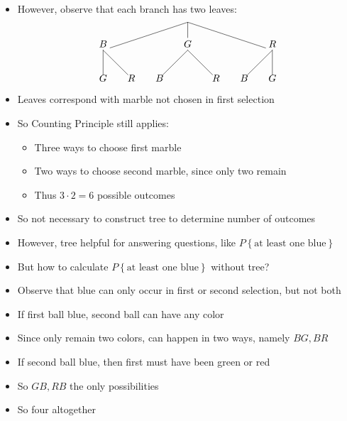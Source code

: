 \documentclass{beamer}
\theoremstyle{definition}
\begin{document}
\begin{frame}
\begin{itemize}
\item However, observe that each branch has two leaves:
\[\begin{xy}<1cm,0cm>:
(0,0)="0";
(-3,-1)="-31";
(0,-1)="01";
(3,-1)="31";
"0";"-31"*+!D{B}**\dir{-};
"0";"01"*+!D{G}**\dir{-};
"0";"31"*+!D{R}**\dir{-};
"-31";(-3,-2)*{G}**\dir{-};
"-31";(-2,-2)*{R}**\dir{-};
"01";(-1,-2)*{B}**\dir{-};
"01";(1,-2)*{R}**\dir{-};
"31";(2,-2)*{B}**\dir{-};
"31";(3,-2)*{G}**\dir{-};
\end{xy}\]
\item Leaves correspond with marble \alert{not chosen}
in first selection
\item So Counting Principle still applies:
\begin{itemize}
\item Three ways to choose first marble
\item \alert{Two} ways to choose second marble, since only two remain
\item Thus $3\cdot 2=6$ possible outcomes
\end{itemize}
\item So not necessary to construct tree to determine
number of outcomes
\item However, tree helpful for answering questions, like
$P\left\{\text{at least one blue}\right\}$
\end{itemize}
\end{frame}

\begin{frame}
\begin{itemize}
\item But how to calculate
$P\left\{\text{at least one blue}\right\}$
without tree?
\item Observe that blue can only occur in first
or second selection, but not both
\item If first ball blue, second ball can have any color
\item Since only remain two colors, can happen in two ways,
namely $BG,BR$
\item If second ball blue, then first must have been green or red
\item So $GB,RB$ the only possibilities
\item So four altogether
\end{itemize}
\end{frame}
\end{document}
